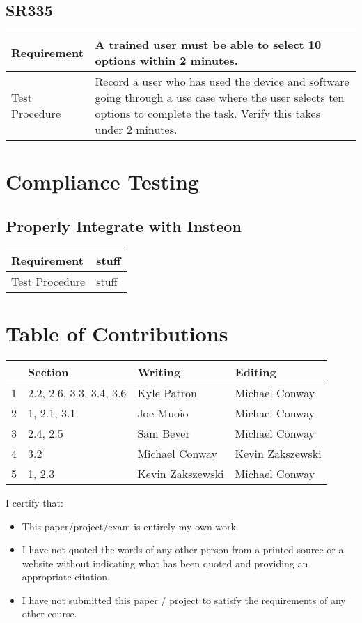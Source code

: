 \documentclass{article}
\begin{document}
\subsection{SR335}
\begin{tabular}{| l | p{12cm}  |}
    \hline
	Requirement & A trained user must be able to select 10 options within 2 minutes. \\ \hline
	Test Procedure & Record a user who has used the device and software going through a use case where the user selects ten options to complete the task. Verify this takes under 2 minutes. \\ \hline
\end{tabular}

\newpage

\section{Compliance Testing}
\subsection{Properly Integrate with Insteon}
\begin{tabular}{| l | p{12cm} |}
    \hline
	Requirement & stuff \\ \hline
	Test Procedure & stuff \\ \hline
\end{tabular}

\newpage
\section*{\centering Table of Contributions}
\begin{tabular}{| l | l | l | l |}
    \hline
     & Section & Writing & Editing \\
    \hline \hline
		1 & 2.2, 2.6, 3.3, 3.4, 3.6 & Kyle Patron & Michael Conway\\ \hline
		2 & 1, 2.1, 3.1 & Joe Muoio & Michael Conway\\ \hline
		3 & 2.4, 2.5 & Sam Bever & Michael Conway\\ \hline
		4 & 3.2 & Michael Conway & Kevin Zakszewski \\ \hline
		5 & 1, 2.3 & Kevin Zakszewski & Michael Conway \\ \hline
\end{tabular}
\newpage
\noindent I certify that:
\begin{itemize}
\item This paper/project/exam is entirely my own work.
\item I have not quoted the words of any other person from a printed source or a website without indicating what has been quoted and providing an appropriate citation.
\item I have not submitted this paper / project to satisfy the requirements of any other course.
\end{itemize}
\end{document}
